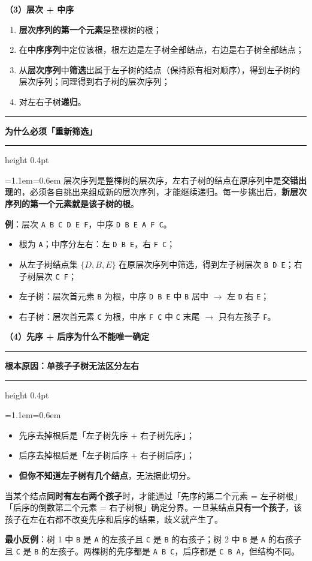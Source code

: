 \documentclass[11pt,openany,UTF8]{ctexbook}
\newcommand{\callouthead}[2]{%
  \par\addvspace{7pt}\noindent
  {\color{#1}\rule[-0.15em]{3pt}{1.05em}}\hspace{0.5em}%
  {\bfseries\color{#1}#2}\par\nobreak\vspace{-0.35em}%
  {\color{rulesep}\hrule height 0.4pt}\nobreak\vspace{0.45em}%
  \begingroup\small\setlength{\parindent}{0pt}%
  \leftskip=1.1em\rightskip=0.6em\noindent\ignorespaces}
\newcommand{\calloutend}{\par\endgroup\addvspace{7pt}}
\newenvironment{callkey}[1]{\callouthead{keybar}{#1}}{\calloutend}
\begin{document}
\textbf{（3）层次 + 中序}

\begin{enumerate}
\item \textbf{层次序列的第一个元素}是整棵树的根；
\item 在\textbf{中序序列}中定位该根，根左边是左子树全部结点，右边是右子树全部结点；
\item 从\textbf{层次序列}中\textbf{筛选}出属于左子树的结点（保持原有相对顺序），得到左子树的层次序列；同理得到右子树的层次序列；
\item 对左右子树\textbf{递归}。
\end{enumerate}
\begin{callkey}{为什么必须「重新筛选」}
层次序列是整棵树的层次序，左右子树的结点在原序列中是\textbf{交错出现}的，必须各自挑出来组成新的层次序列，才能继续递归。每一步挑出后，\textbf{新层次序列的第一个元素就是该子树的根}。

\end{callkey}

\textbf{例}：层次 \texttt{A B C D E F}，中序 \texttt{D B E A F C}。

\begin{itemize}
\item 根为 \texttt{A}；中序分左右：左 \texttt{D B E}，右 \texttt{F C}；
\item 从左子树结点集 $\{D,B,E\}$ 在原层次序列中筛选，得到左子树层次 \texttt{B D E}；右子树层次 \texttt{C F}；
\item 左子树：层次首元素 \texttt{B} 为根，中序 \texttt{D B E} 中 \texttt{B} 居中 $\to$ 左 \texttt{D} 右 \texttt{E}；
\item 右子树：层次首元素 \texttt{C} 为根，中序 \texttt{F C} 中 \texttt{C} 末尾 $\to$ 只有左孩子 \texttt{F}。
\end{itemize}
\textbf{（4）先序 + 后序为什么不能唯一确定}

\begin{callkey}{根本原因：单孩子子树无法区分左右}
\begin{itemize}
\item 先序去掉根后是「左子树先序 + 右子树先序」；
\item 后序去掉根后是「左子树后序 + 右子树后序」；
\item \textbf{但你不知道左子树有几个结点}，无法据此切分。
\end{itemize}
当某个结点\textbf{同时有左右两个孩子}时，才能通过「先序的第二个元素 = 左子树根」「后序的倒数第二个元素 = 右子树根」确定分界。一旦某结点\textbf{只有一个孩子}，该孩子在左在右都不改变先序和后序的结果，歧义就产生了。

\textbf{最小反例}：树 1 中 \texttt{B} 是 \texttt{A} 的左孩子且 \texttt{C} 是 \texttt{B} 的右孩子；树 2 中 \texttt{B} 是 \texttt{A} 的右孩子且 \texttt{C} 是 \texttt{B} 的左孩子。两棵树的先序都是 \texttt{A B C}，后序都是 \texttt{C B A}，但结构不同。

\end{callkey}
\end{document}
